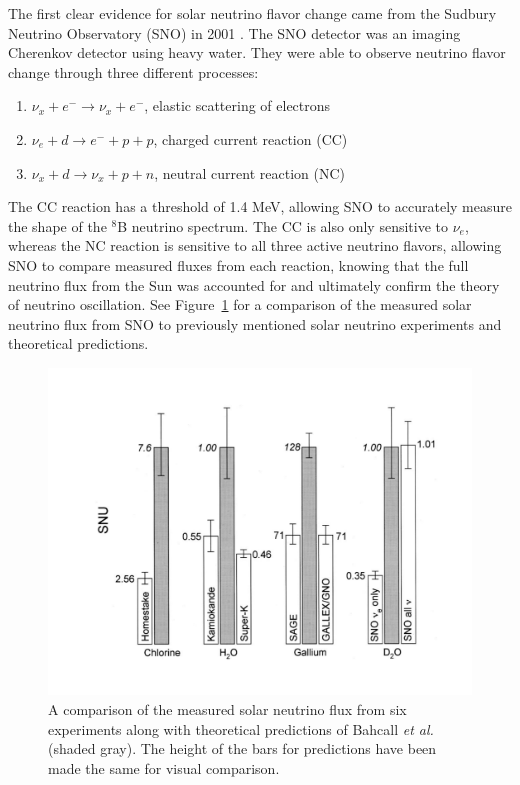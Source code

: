 The first clear evidence for solar neutrino flavor change came from the Sudbury Neutrino Observatory (SNO) in 2001 \cite{SNO,SNOOsc}. 
The SNO detector was an imaging Cherenkov detector using heavy water.
They were able to observe neutrino flavor change through three different processes:
 \renewcommand{\labelenumi}{(\roman{enumi})}
\begin{enumerate}
	\centering
	\item  ${\nu_x + {e^-} \rightarrow \nu_x + {e^-}}$, elastic scattering of electrons
	\item $\nu_e + d \rightarrow {e^-} + p + p$, charged current reaction (CC)
	\item $\nu_x + d \rightarrow \nu_x + p+ n$, neutral current reaction (NC)
\end{enumerate}
The CC reaction has a threshold of 1.4 MeV, allowing SNO to accurately measure the shape of the $^{8}$B neutrino spectrum.
The CC is also only sensitive to $\nu_{e}$, whereas the NC reaction is sensitive to all three active neutrino flavors, allowing SNO to compare measured fluxes from each reaction, knowing that the full neutrino flux from the Sun was accounted for
 and ultimately confirm the theory of neutrino oscillation.
See Figure~\ref{fig:expsolarflux} for a comparison of the measured solar neutrino flux from SNO to previously mentioned solar neutrino experiments and theoretical predictions.

\begin{figure}[t!]
	\centering
	\includegraphics[width=0.6\linewidth]{tex/2-neutrinos-images/ExpSolarFlux}
	\caption[]{A comparison of the measured solar neutrino flux from six experiments along with theoretical predictions of Bahcall \textit{et al.} \cite{Bahcall:2000nu} (shaded gray). The height of the bars for predictions have been made the same for visual comparison. \cite{RevModPhys.75.985}}
	\label{fig:expsolarflux}
\end{figure}


